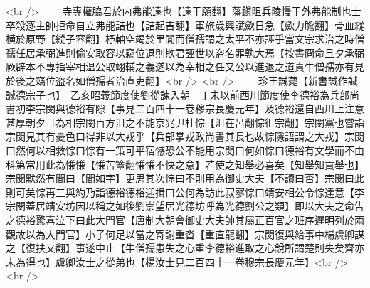 <br />
　　寺專權脇君於内弗能遠也【遠于願翻】藩鎭阻兵陵慢于外弗能制也士卒殺逐主帥拒命自立弗能詰也【詰起吉翻】軍旅歲興賦歛日急【歛力瞻翻】骨血縱横於原野【縱子容翻】杼軸空竭於里閭而僧孺謂之太平不亦誣乎當文宗求治之時僧孺任居承弼進則偷安取容以竊位退則欺君誣世以盗名罪孰大焉【按書冏命旦夕承弼厥辟本不專指宰相温公取翊輔之義遂以為宰相之任又公以進退之道責牛僧孺亦有見於後之竊位盗名如僧孺者治直吏翻】<br />
<br />
　　珍王誠薨【新書誠作諴諴德宗子也】　乙亥昭義節度使劉從諫入朝　丁未以前西川節度使李德裕為兵部尚書初李宗閔與德裕有隙【事見二百四十一卷穆宗長慶元年】及德裕還自西川上注意甚厚朝夕且為相宗閔百方沮之不能京兆尹杜悰【沮在呂翻悰徂宗翻】宗閔黨也嘗詣宗閔見其有憂色曰得非以大戎乎【兵部掌戎政尚書其長也故悰隱語謂之大戎】宗閔曰然何以相救悰曰悰有一策可平宿憾恐公不能用宗閔曰何如悰曰德裕有文學而不由科第常用此為慊慊【慊苦簟翻慊慊不快之意】若使之知舉必喜矣【知舉知貢舉也】宗閔默然有間曰【間如字】更思其次悰曰不則用為御史大夫【不讀曰否】宗閔曰此則可矣悰再三與約乃詣德裕德裕迎揖曰公何為訪此寂寥悰曰靖安相公令悰達意【李宗閔蓋居靖安坊因以稱之如後劉崇望居光德坊呼為光德劉公之類】即以大夫之命告之德裕驚喜泣下曰此大門官【唐制大朝會御史大夫帥其屬正百官之班序遲明列於兩觀故以為大門官】小子何足以當之寄謝重沓【重直龍翻】宗閔復與給事中楊虞卿謀之【復扶又翻】事遂中止【牛僧孺患失之心重李德裕進取之心銳所謂楚則失矣齊亦未為得也】虞卿汝士之從弟也【楊汝士見二百四十一卷穆宗長慶元年】<br />
<br />
